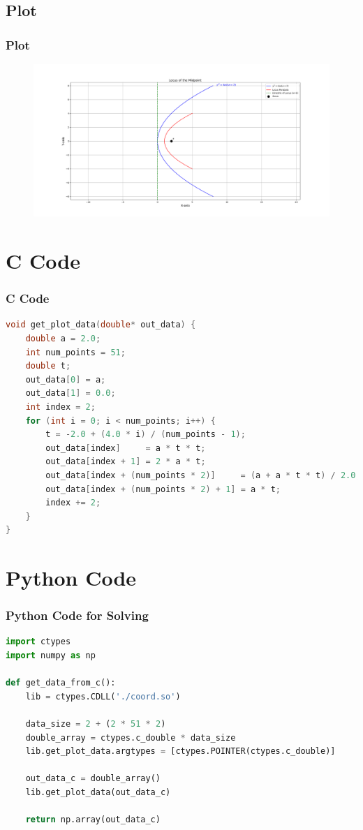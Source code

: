 \documentclass{beamer}
\theoremstyle{remark}
\numberwithin{equation}{section}
\begin{document}
\subsection{Plot}
\begin{frame}[fragile]
\frametitle{Plot}

\begin{figure}[h!]
   \centering
   \includegraphics[width=0.7\columnwidth]{figs/fig1.png}
	\caption{}
   \label{}
\end{figure}
\end{frame}

\section{C Code}
\begin{frame}[fragile]
\frametitle{C Code}
\begin{lstlisting}[language=C]
void get_plot_data(double* out_data) {
    double a = 2.0;
    int num_points = 51;
    double t;
    out_data[0] = a;
    out_data[1] = 0.0;
    int index = 2;
    for (int i = 0; i < num_points; i++) {
        t = -2.0 + (4.0 * i) / (num_points - 1);
        out_data[index]     = a * t * t;
        out_data[index + 1] = 2 * a * t;
        out_data[index + (num_points * 2)]     = (a + a * t * t) / 2.0;
        out_data[index + (num_points * 2) + 1] = a * t;
        index += 2;
    }
}

    \end{lstlisting}
\end{frame}

\section{Python Code}
\begin{frame}[fragile]
\frametitle{Python Code for Solving}
\begin{lstlisting}[language=Python]
import ctypes
import numpy as np

def get_data_from_c():
    lib = ctypes.CDLL('./coord.so')

    data_size = 2 + (2 * 51 * 2)
    double_array = ctypes.c_double * data_size
    lib.get_plot_data.argtypes = [ctypes.POINTER(ctypes.c_double)]

    out_data_c = double_array()
    lib.get_plot_data(out_data_c)

    return np.array(out_data_c)

\end{lstlisting}
\end{frame}
 
\end{document}
